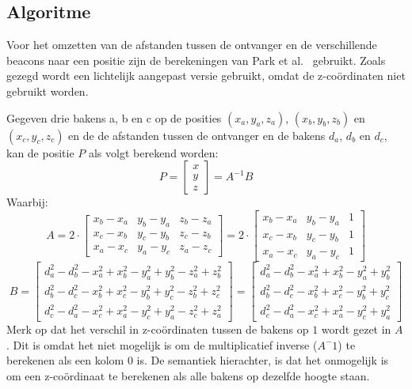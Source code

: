 \documentclass[a4paper,10pt]{article}
\begin{document}
\subsection{Algoritme} \label{sec:alg}
Voor het omzetten van de afstanden tussen de ontvanger en de verschillende beacons naar een positie zijn de berekeningen van Park et al.~\cite{park2011beacon} gebruikt. Zoals gezegd wordt een lichtelijk aangepast versie gebruikt, omdat de z-co\"ordinaten niet gebruikt worden.

Gegeven drie bakens a, b en c op de posities $(x_a, y_a, z_a)$, $(x_b, y_b, z_b)$ en $(x_c, y_c, z_c)$ en de de afstanden tussen de ontvanger en de bakens $d_a$, $d_b$ en $d_c$, kan de positie $P$ als volgt berekend worden:
$$P = 
    \begin{bmatrix}
        x\\
        y\\
        z
    \end{bmatrix}
    = A^{-1}B
$$
Waarbij:
$$A = 2 \cdot
    \begin{bmatrix}
        x_b - x_a & y_b - y_a & z_b - z_a \\
        x_c - x_b & y_c - y_b & z_c - z_b \\
        x_a - x_c & y_a - y_c & z_a - z_c
    \end{bmatrix}
    = 2 \cdot
    \begin{bmatrix}
        x_b - x_a & y_b - y_a & 1 \\
        x_c - x_b & y_c - y_b & 1 \\
        x_a - x_c & y_a - y_c & 1
    \end{bmatrix}
$$
$$B = 
    \begin{bmatrix}
        d_a^2 - d_b^2 - x_a^2 + x_b^2 - y_a^2 + y_b^2 - z_a^2 + z_b^2 \\
        d_b^2 - d_c^2 - x_b^2 + x_c^2 - y_b^2 + y_c^2 - z_b^2 + z_c^2 \\
        d_c^2 - d_a^2 - x_c^2 + x_a^2 - y_c^2 + y_a^2 - z_c^2 + z_a^2
    \end{bmatrix}
    =
    \begin{bmatrix}
        d_a^2 - d_b^2 - x_a^2 + x_b^2 - y_a^2 + y_b^2 \\
        d_b^2 - d_c^2 - x_b^2 + x_c^2 - y_b^2 + y_c^2 \\
        d_c^2 - d_a^2 - x_c^2 + x_a^2 - y_c^2 + y_a^2
    \end{bmatrix}
$$
Merk op dat het verschil in z-co\"ordinaten tussen de bakens op $1$ wordt gezet in $A$. Dit is omdat het niet mogelijk is om de multiplicatief inverse ($A^-1$) te berekenen als een kolom $0$ is. De semantiek hierachter, is dat het onmogelijk is om een z-co\"ordinaat te berekenen als alle bakens op dezelfde hoogte staan.
\end{document}
